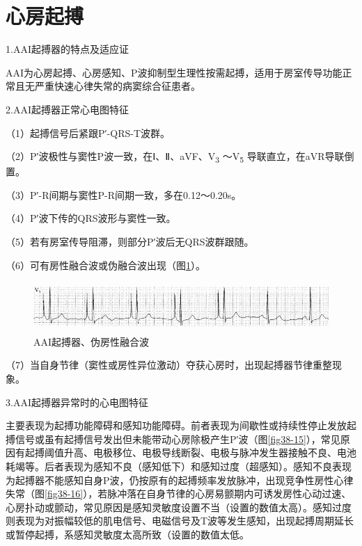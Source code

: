 \protect\hypertarget{text00045.htmlux5cux23subid491}{}{}

\section{心房起搏}

1.AAI起搏器的特点及适应证

AAI为心房起搏、心房感知、P波抑制型生理性按需起搏，适用于房室传导功能正常且无严重快速心律失常的病窦综合征患者。

2.AAI起搏器正常心电图特征

（1）起搏信号后紧跟P′-QRS-T波群。

（2）P′波极性与窦性P波一致，在Ⅰ、Ⅱ、aVF、V\textsubscript{3}
～V\textsubscript{5} 导联直立，在aVR导联倒置。

（3）P′-R间期与窦性P-R间期一致，多在0.12～0.20s。

（4）P′波下传的QRS波形与窦性一致。

（5）若有房室传导阻滞，则部分P′波后无QRS波群跟随。

（6）可有房性融合波或伪融合波出现（图\ref{fig38-14}）。

\begin{figure}[!htbp]
 \centering
 \includegraphics[width=5.58333in,height=0.75in]{./images/Image00617.jpg}
 \captionsetup{justification=centering}
 \caption{AAI起搏器、伪房性融合波}
 \label{fig38-14}
  \end{figure} 

（7）当自身节律（窦性或房性异位激动）夺获心房时，出现起搏器节律重整现象。

3.AAI起搏器异常时的心电图特征

主要表现为起搏功能障碍和感知功能障碍。前者表现为间歇性或持续性停止发放起搏信号或虽有起搏信号发出但未能带动心房除极产生P′波（图\ref{fig38-15}），常见原因有起搏阈值升高、电极移位、电极导线断裂、电极与脉冲发生器接触不良、电池耗竭等。后者表现为感知不良（感知低下）和感知过度（超感知）。感知不良表现为起搏器不能感知自身P波，仍按原有的起搏频率发放脉冲，出现竞争性房性心律失常（图\ref{fig38-16}），若脉冲落在自身节律的心房易颤期内可诱发房性心动过速、心房扑动或颤动，常见原因是感知灵敏度设置不当（设置的数值太高）。感知过度则表现为对振幅较低的肌电信号、电磁信号及T波等发生感知，出现起搏周期延长或暂停起搏，系感知灵敏度太高所致（设置的数值太低。


